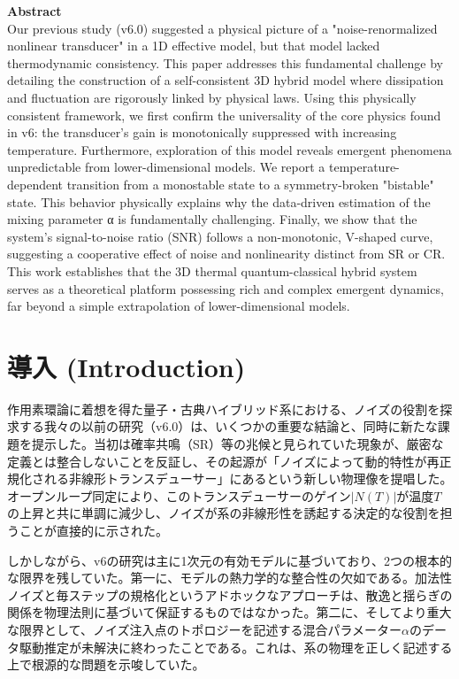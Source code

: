 \documentclass[a4paper,11pt,ja=standard,lualatex]{bxjsarticle}
\begin{document}
\noindent\textbf{Abstract}\\
\small
Our previous study (v6.0) suggested a physical picture of a "noise-renormalized nonlinear transducer" in a 1D effective model, but that model lacked thermodynamic consistency. This paper addresses this fundamental challenge by detailing the construction of a self-consistent 3D hybrid model where dissipation and fluctuation are rigorously linked by physical laws. Using this physically consistent framework, we first confirm the universality of the core physics found in v6: the transducer's gain is monotonically suppressed with increasing temperature. Furthermore, exploration of this model reveals emergent phenomena unpredictable from lower-dimensional models. We report a temperature-dependent transition from a monostable state to a symmetry-broken "bistable" state. This behavior physically explains why the data-driven estimation of the mixing parameter α is fundamentally challenging. Finally, we show that the system's signal-to-noise ratio (SNR) follows a non-monotonic, V-shaped curve, suggesting a cooperative effect of noise and nonlinearity distinct from SR or CR. This work establishes that the 3D thermal quantum-classical hybrid system serves as a theoretical platform possessing rich and complex emergent dynamics, far beyond a simple extrapolation of lower-dimensional models.
\normalsize

\FloatBarrier

\section{導入 (Introduction)}
\label{sec:introduction}
作用素環論に着想を得た量子・古典ハイブリッド系における、ノイズの役割を探求する我々の以前の研究（v6.0）は、いくつかの重要な結論と、同時に新たな課題を提示した。当初は確率共鳴（SR）等の兆候と見られていた現象が、厳密な定義とは整合しないことを反証し\cite{Gammaitoni1998, Lindner2004}、その起源が「ノイズによって動的特性が再正規化される非線形トランスデューサー」にあるという新しい物理像を提唱した。オープンループ同定\cite{Gelb1968, Khalil2002}により、このトランスデューサーのゲイン$|N(T)|$が温度$T$の上昇と共に単調に減少し、ノイズが系の非線形性を誘起する決定的な役割を担うことが直接的に示された。

しかしながら、v6の研究は主に1次元の有効モデルに基づいており、2つの根本的な限界を残していた。第一に、モデルの熱力学的な整合性の欠如である。加法性ノイズと毎ステップの規格化というアドホックなアプローチは、散逸と揺らぎの関係を物理法則に基づいて保証するものではなかった。第二に、そしてより重大な限界として、ノイズ注入点のトポロジーを記述する混合パラメーター$\alpha$のデータ駆動推定が未解決に終わったことである。これは、系の物理を正しく記述する上で根源的な問題を示唆していた。
\end{document}

